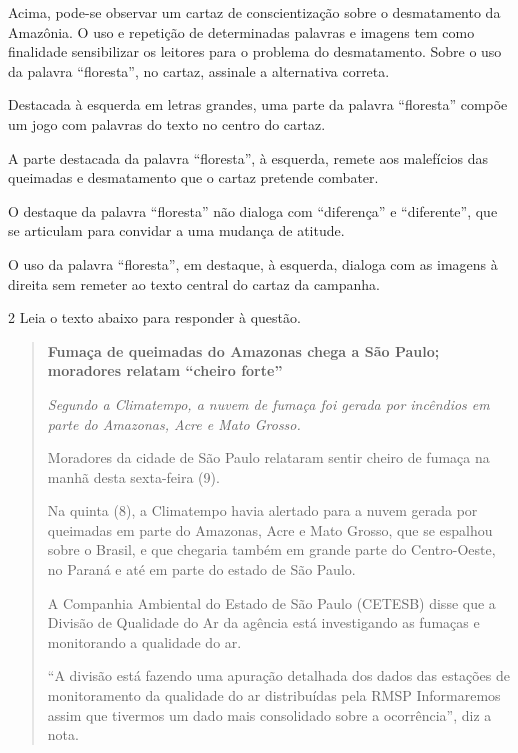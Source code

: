 
Acima, pode-se observar um cartaz de conscientização sobre o desmatamento da
Amazônia. O uso e repetição de determinadas palavras e imagens tem como
finalidade sensibilizar os leitores para o problema do desmatamento.
Sobre o uso da palavra ``floresta'', no cartaz, assinale a alternativa
correta.

\begin{escolha}

  \item Destacada à esquerda em letras grandes, uma parte da palavra ``floresta'' compõe um jogo com 
  palavras do texto no centro do cartaz.   

  \item A parte destacada da palavra ``floresta'', à esquerda, remete aos malefícios das queimadas e desmatamento
  que o cartaz pretende combater. 

  \item O destaque da palavra ``floresta'' não dialoga com ``diferença'' e ``diferente'', que se articulam para convidar a uma mudança de atitude.

  \item O uso da palavra ``floresta'', em destaque, à esquerda, dialoga com as imagens à direita sem remeter ao texto central do cartaz da campanha. 

\end{escolha}


\num{2} Leia o texto abaixo para responder à questão. 

\begin{quote}
\textbf{Fumaça de queimadas do Amazonas chega a São Paulo; moradores
relatam ``cheiro forte''}

\textit{Segundo a Climatempo, a nuvem de fumaça foi gerada por incêndios em
parte do Amazonas, Acre e Mato Grosso.}

Moradores da cidade de São Paulo relataram sentir cheiro de fumaça na
manhã desta sexta-feira (9).

Na quinta (8), a Climatempo havia alertado para a nuvem gerada por
queimadas em parte do Amazonas, Acre e Mato Grosso, que se espalhou sobre o
Brasil, e que chegaria também em grande parte do Centro-Oeste, no Paraná
e até em parte do estado de São Paulo.

A Companhia Ambiental do Estado de São Paulo (CETESB) disse que a
Divisão de Qualidade do Ar da agência está investigando as fumaças e
monitorando a qualidade do ar.

``A divisão está fazendo uma apuração detalhada dos dados das
estações de monitoramento da qualidade do ar distribuídas pela RMSP
Informaremos assim que tivermos um dado mais consolidado sobre a
ocorrência'', diz a nota.
\end{quote}

